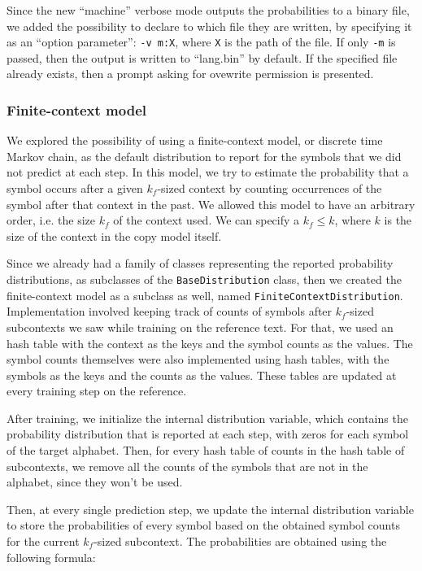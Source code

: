 \documentclass{article}
\begin{document}
Since the new ``machine'' verbose mode outputs the probabilities to a binary file, we added the possibility to declare to which file they are written, by specifying it as an ``option parameter'': \verb|-v m:X|, where \verb|X| is the path of the file.
If only \verb|-m| is passed, then the output is written to ``lang.bin'' by default.
If the specified file already exists, then a prompt asking for ovewrite permission is presented.

\subsubsection{Finite-context model}
\label{subsubsec:methodology_lang_model_fcm}

We explored the possibility of using a finite-context model, or discrete time Markov chain, as the default distribution to report for the symbols that we did not predict at each step.
In this model, we try to estimate the probability that a symbol occurs after a given $k_f$-sized context by counting occurrences of the symbol after that context in the past.
We allowed this model to have an arbitrary order, i.e. the size $k_f$ of the context used.
We can specify a $k_f \leq k$, where $k$ is the size of the context in the copy model itself.

Since we already had a family of classes representing the reported probability distributions, as subclasses of the \verb|BaseDistribution| class, then we created the finite-context model as a subclass as well, named \verb|FiniteContextDistribution|.
Implementation involved keeping track of counts of symbols after $k_f$-sized subcontexts we saw while training on the reference text.
For that, we used an hash table with the context as the keys and the symbol counts as the values.
The symbol counts themselves were also implemented using hash tables, with the symbols as the keys and the counts as the values.
These tables are updated at every training step on the reference.

After training, we initialize the internal distribution variable, which contains the probability distribution that is reported at each step, with zeros for each symbol of the target alphabet.
Then, for every hash table of counts in the hash table of subcontexts, we remove all the counts of the symbols that are not in the alphabet, since they won't be used.

Then, at every single prediction step, we update the internal distribution variable to store the probabilities of every symbol based on the obtained symbol counts for the current $k_f$-sized subcontext.
The probabilities are obtained using the following formula:
\end{document}
